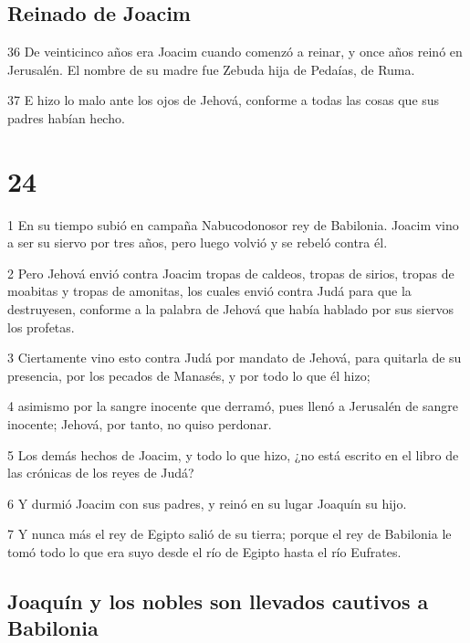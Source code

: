 \section*{Reinado de Joacim}

\par 36 De veinticinco años era Joacim cuando comenzó a reinar, y once años reinó en Jerusalén. El nombre de su madre fue Zebuda hija de Pedaías, de Ruma.
\par 37 E hizo lo malo ante los ojos de Jehová, conforme a todas las cosas que sus padres habían hecho.

\chapter{24}

\par 1 En su tiempo subió en campaña Nabucodonosor rey de Babilonia. Joacim vino a ser su siervo por tres años, pero luego volvió y se rebeló contra él.
\par 2 Pero Jehová envió contra Joacim tropas de caldeos, tropas de sirios, tropas de moabitas y tropas de amonitas, los cuales envió contra Judá para que la destruyesen, conforme a la palabra de Jehová que había hablado por sus siervos los profetas.
\par 3 Ciertamente vino esto contra Judá por mandato de Jehová, para quitarla de su presencia, por los pecados de Manasés, y por todo lo que él hizo;
\par 4 asimismo por la sangre inocente que derramó, pues llenó a Jerusalén de sangre inocente; Jehová, por tanto, no quiso perdonar.
\par 5 Los demás hechos de Joacim, y todo lo que hizo, ¿no está escrito en el libro de las crónicas de los reyes de Judá?
\par 6 Y durmió Joacim con sus padres, y reinó en su lugar Joaquín su hijo.
\par 7 Y nunca más el rey de Egipto salió de su tierra; porque el rey de Babilonia le tomó todo lo que era suyo desde el río de Egipto hasta el río Eufrates.

\section*{Joaquín y los nobles son llevados cautivos a Babilonia}

